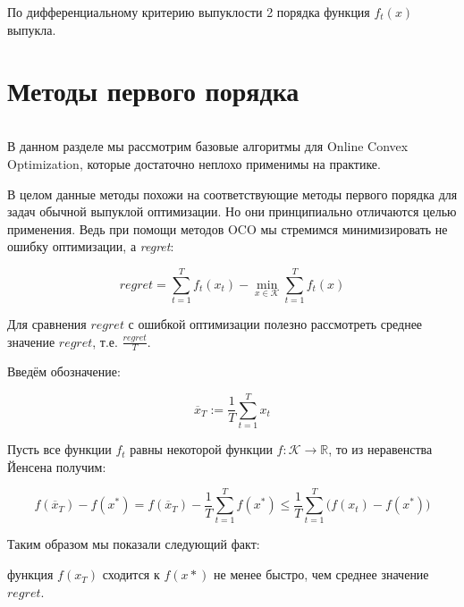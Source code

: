 \documentclass[12pt]{article}
\begin{document}
По дифференциальному критерию выпуклости 2 порядка функция $f_t(x)$ выпукла. 

\section*{Методы первого порядка}
$ $

В данном разделе мы рассмотрим базовые алгоритмы для Online Convex Optimization, которые достаточно неплохо применимы на практике.

В целом данные методы похожи на соответствующие методы первого порядка для задач обычной выпуклой оптимизации. Но они принципиально отличаются целью применения. Ведь при помощи методов OCO мы стремимся минимизировать не ошибку оптимизации, а \textit{regret}:

$$regret = \sum\limits_{t=1}^T f_t(x_t) - \min\limits_{x \in \mathcal{K}} \sum\limits_{t=1}^T f_t(x)$$

Для сравнения $regret$ с ошибкой оптимизации полезно рассмотреть среднее значение $regret$, т.е. $\frac{regret}{T}$.

Введём обозначение:

$$\overline{x}_T := \frac{1}{T}\sum\limits_{t=1}^T x_t$$

Пусть все функции $f_t$ равны некоторой функции $f : \mathcal{K} \rightarrow \mathbb{R}$, то из неравенства Йенсена получим:

$$f(\overline{x}_T)-f(x^*) = f(\overline{x}_T)- \frac{1}{T} \sum\limits_{t=1}^T f(x^*) \leq \frac{1}{T}\sum\limits_{t=1}^T \big(f(x_t)-   f(x^*)\big	)$$

Таким образом мы показали следующий факт: 

функция $f(x_T)$ сходится к $f(x*)$ не менее быстро, чем среднее значение $regret$.
\end{document}
